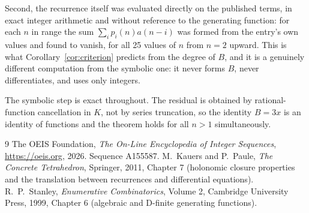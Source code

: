 \documentclass[11pt,a4paper]{article}
\theoremstyle{plain}
\theoremstyle{definition}
\begin{document}
Second, the recurrence itself was evaluated directly on the published terms, in exact
integer arithmetic and without reference to the generating function: for each $n$ in range
the sum $\sum_{i}p_{i}(n)a(n-i)$ was formed from the entry's own values and found to
vanish, for all 25 values of $n$ from $n=2$ upward. This is what
Corollary~\ref{cor:criterion} predicts from the degree of $B$, and it is a genuinely
different computation from the symbolic one: it never forms $B$, never differentiates, and
uses only integers.

The symbolic step is exact throughout. The residual is obtained by rational-function
cancellation in $K$, not by series truncation, so the identity $B=3 x$ is an
identity of functions and the theorem holds for all $n>1$ simultaneously.

\begin{thebibliography}{9}
 The OEIS Foundation, \emph{The On-Line Encyclopedia of Integer Sequences},
\url{https://oeis.org}, 2026. Sequence A155587.
 M.~Kauers and P.~Paule, \emph{The Concrete Tetrahedron}, Springer, 2011,
Chapter 7 (holonomic closure properties and the translation between recurrences and
differential equations).
 R.~P.~Stanley, \emph{Enumerative Combinatorics}, Volume 2, Cambridge
University Press, 1999, Chapter 6 (algebraic and D-finite generating functions).
\end{thebibliography}
\end{document}
